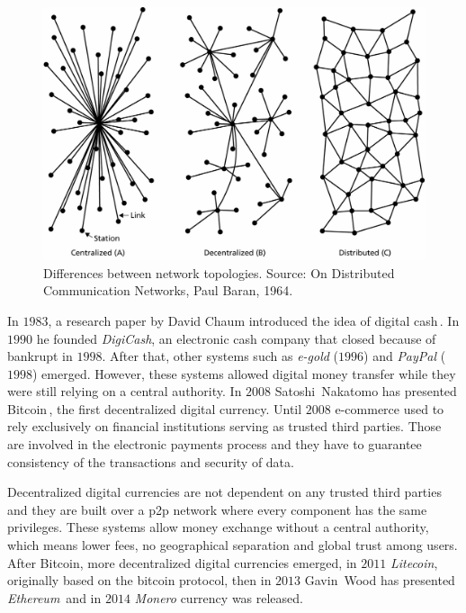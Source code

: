 \documentclass[USenglish]{uit-thesis}
\begin{document}
\begin{figure}[h!]
	\centering
	\includegraphics[width=1\textwidth]{img/networks}
	\caption{Differences between network topologies. Source: On Distributed
		Communication Networks, Paul Baran, 1964.}
	\label{fig:networks}
\end{figure}

In $1983$, a research paper by David Chaum introduced the idea of digital cash\,\cite{chaum83blindsign}. In $1990$ he founded \emph{DigiCash},
an electronic cash company that closed because of bankrupt in
$1998$. After that, other systems such as \emph{e-gold} ($1996$) and
\emph{PayPal} ($1998$) emerged. However, these systems allowed
digital money transfer while they were still relying on a central authority.
In $2008$ Satoshi~Nakatomo has presented Bitcoin\,\cite{Nakamoto_bitcoin},
the first decentralized digital currency.
Until $2008$ e-commerce used to rely exclusively on financial institutions
serving as trusted third parties. Those are involved in the electronic
payments process and they have to guarantee consistency of the
transactions and security of data.

Decentralized digital currencies are not
dependent on any trusted third parties and they are built over a
\gls{p2p} network where every component has the same
privileges. These systems allow money exchange
without a central authority, which means lower fees, no geographical
separation and global trust among users. After Bitcoin,
more decentralized digital currencies emerged, in $2011$ \emph{Litecoin},
originally based on the bitcoin protocol, then in $2013$
Gavin~Wood has presented \emph{Ethereum}\,\cite{ethereum} and in
$2014$ \emph{Monero} currency was released.
\end{document}
